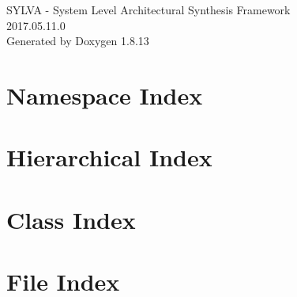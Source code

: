 \documentclass[twoside]{book}
\newcommand{\+}{\discretionary{\mbox{\scriptsize$\hookleftarrow$}}{}{}}
\newcommand{\clearemptydoublepage}{%
  \newpage{\pagestyle{empty}\cleardoublepage}%
}
\begin{document}
\hypersetup{pageanchor=false,
             bookmarksnumbered=true,
             pdfencoding=unicode
            }
\begin{titlepage}
\vspace*{7cm}
\begin{center}%
{\Large S\+Y\+L\+VA -\/ System Level Architectural Synthesis Framework \\[1ex]\large 2017.\+05.\+11.\+0 }\\
\vspace*{1cm}
{\large Generated by Doxygen 1.8.13}\\
\end{center}
\end{titlepage}
\clearemptydoublepage
{}
\tableofcontents
\clearemptydoublepage
{}
\hypersetup{pageanchor=true}

\chapter{Namespace Index}

\chapter{Hierarchical Index}

\chapter{Class Index}

\chapter{File Index}

\end{document}
